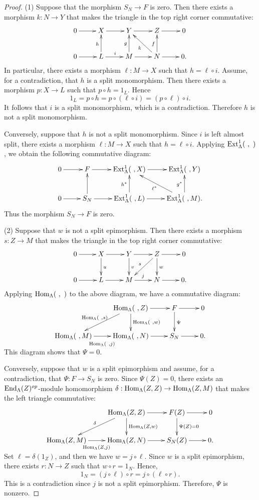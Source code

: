 \documentclass[11pt]{amsart}
\theoremstyle{definition}
\numberwithin{equation}{section}
\begin{document}
\begin{proof}
(1) Suppose that the morphism $S_N \to F$ is zero. 
Then there exists a morphism $k: N \to Y$ that makes the triangle in the top right corner commutative: 
$$
\xymatrix{
0 \ar[r] & X \ar[r] & Y \ar[r] & Z \ar[r] & 0 \\
0 \ar[r] & L \ar[r]^i \ar[u]^h & M \ar[r] \ar[u]^g %
& N \ar[r] \ar[u]^f \ar[ul]^k & 0 .
}
$$
In particular, there exists a morphism $\ell : M \to X$ such that $h = \ell \circ i$.
Assume, for a contradiction, that $h$ is a split monomorphism. 
Then there exists a morphism $p : X \to L$ such that $p \circ h = 1_L$. 
Hence
$$
1_L = p \circ h = p \circ (\ell \circ i) = (p \circ \ell) \circ i.
$$
It follows that $i$ is a split monomorphism, which is a contradiction. 
Therefore $h$ is not a split monomorphism.

Conversely, suppose that $h$ is not a split monomorphism. 
Since $i$ is left almost split, there exists a morphism $\ell : M \to X$ such that $h = \ell \circ i$.
Applying $\mathrm{Ext}_\Lambda^1(\ , \ )$, we obtain the following commutative diagram:
$$
\xymatrix{
0 \ar[r] & F \ar[r] & \Ext_\LL^1(\ , X) \ar[r] & \Ext_\LL^1(\ , Y) \\
0 \ar[r] & S_N \ar[r] \ar[u] & \Ext_{\LL}^1(\ , L) \ar[r] \ar[u]^{h^\ast} & \Ext_\LL^1(\ , M) \ar[u]^{g^\ast} \ar[ul]^{\ell^\ast}.
}
$$
Thus the morphism $S_N \to F$ is zero. 

(2) Suppose that $w$ is not a split epimorphism. 
Then there exists a morphism $s: Z \to M$ that makes the triangle in the top right corner commutative: 
$$
\xymatrix{
0 \ar[r] & X \ar[r]\ar[d]^u  & Y \ar[r]\ar[d]^v& Z \ar[r]\ar[d]^w \ar[dl]_s & 0 \\
0 \ar[r] & L \ar[r] & M \ar[r]^j & N \ar[r]  & 0 .
}
$$
Applying $\mathrm{Hom}_\Lambda(\ , \ )$ to the above diagram, we have a commutative diagram:
$$
\xymatrix{
& \HomL(\ , Z) \ar[r]\ar[d]^{\HomL(\ , w)} \ar[dl]_{\HomL(\ , s)} & F\ar[r]\ar[d]^{\Psi}& 0 \\
 \HomL(\ , M) \ar[r]_{\smash{\lower2.3ex\hbox{$\scriptstyle\HomL(\ ,j)$}}}& \HomL(\ , N) \ar[r]  & S_N \ar[r]& 0.
}
$$
This diagram shows that $\Psi = 0$. 

Conversely, suppose that $w$ is a split epimorphism and assume, for a contradiction, that $\Psi : F \to S_N$ is zero. 
Since $\Psi(Z) =0$, there exists an $\mathrm{End}_{\Lambda} (Z)^{op}$-module homomorphism $\delta : \mathrm{Hom}_\Lambda (Z, Z) \to \mathrm{Hom}_\Lambda(Z, M)$ that makes the left triangle commutative: 
$$
\xymatrix{
& \HomL(Z , Z) \ar[r]\ar[d]^{\HomL(Z , w)}\ar[dl]_{\delta} & F(Z)\ar[r]\ar[d]^{\Psi(Z)=0}& 0 \\
 \HomL(Z, M) \ar[r]_{\smash{\lower2.0ex\hbox{$\scriptstyle\HomL(Z, j)$}}}& \HomL(Z , N) \ar[r]  & S_N(Z) \ar[r]& 0.
}
$$
Set $\ell = \delta (1_Z)$, and then we have $w= j \circ \ell$. 
Since $w$ is a split epimorphism, there exists $r: N \to Z$ such that $w \circ r = 1_N$. 
Hence,
$$
1_N = (j \circ \ell) \circ r = j \circ (\ell \circ r). 
$$
This is a contradiction since $j$ is not a split epimorphism. 
Therefore, $\Psi$ is nonzero. 
\end{proof}
\end{document}
